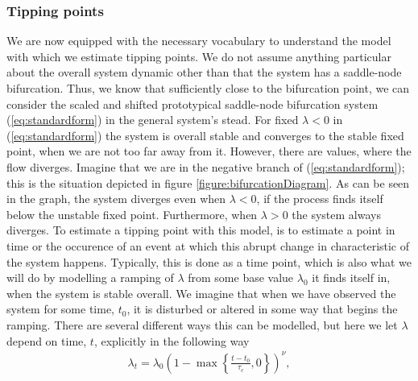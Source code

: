 \subsubsection{Tipping points}
We are now equipped with the necessary vocabulary to understand the model with which we estimate tipping points. We do not assume anything particular about the overall system dynamic other than that the system has a saddle-node bifurcation. Thus, we know that sufficiently close to the bifurcation point, we can consider the scaled and shifted prototypical saddle-node bifurcation system (\ref{eq:standardform}) in the general system's stead. For fixed $\lambda < 0$ in (\ref{eq:standardform}) the system is overall stable and converges to the stable fixed point, when we are not too far away from it. However, there are values, where the flow  diverges. Imagine that we are in the negative branch of (\ref{eq:standardform}); this is the situation depicted in figure \ref{figure:bifurcationDiagram}. As can be seen in the graph, the system diverges even when $\lambda<0$, if the process finds itself below the unstable fixed point. Furthermore, when $\lambda>0$ the system always diverges. To estimate a tipping point with this model, is to estimate a point in time or the occurence of an event at which this abrupt change in characteristic of the system happens. Typically, this is done as a time point, which is also what we will do by modelling a ramping of $\lambda$ from some base value $\lambda_0$ it finds itself in, when the system is stable overall. We imagine that when we have observed the system for some time, $t_0$, it is disturbed or altered in some way that begins the ramping. There are several different ways this can be modelled, but here we let $\lambda$ depend on time, $t$, explicitly in the following way
\begin{align}
    \lambda_t = \lambda_0\left(1 - \max\left\{\frac{t - t_0}{\tau_c},0\right\}\right)^\nu, \label{eq:lambdaRampDefinition}
\end{align} 
